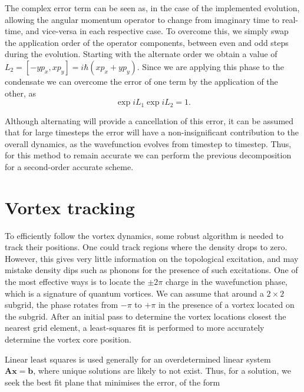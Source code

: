  The complex error term can be seen as, in the case of the implemented evolution, allowing the angular momentum operator to change from imaginary time to real-time, and vice-versa in each respective case. To overcome this, we simply swap the application order of the operator components, between even and odd steps during the evolution. Starting with the alternate order we obtain a value of $L_2 = [-y p_x, x p_y] = i\hbar \left(x p_x + y p_y \right)$. Since we are applying this phase to the condensate we can overcome the error of one term by the application of the other, as
 \begin{equation}
 \exp{i L_1}\exp{i L_2} = 1.
 \end{equation}

 Although alternating will provide a cancellation of this error, it can be assumed that for large timesteps the error will have a non-insignificant contribution to the overall dynamics, as the wavefunction evolves from timestep to timestep. Thus, for this method to remain accurate we can perform the previous decomposition for a second-order accurate scheme.

 \section{Vortex tracking}
 To efficiently follow the vortex dynamics, some robust algorithm is needed to track their positions. One could track regions where the density drops to zero. However, this gives very little information on the topological excitation, and may mistake density dips such as phonons for the presence of such excitations. One of the most effective ways is to locate the $\pm 2\pi$ charge in the wavefunction phase, which is a signature of quantum vortices. We can assume that around a $2\times 2$ subgrid, the phase rotates from $-\pi$ to $+\pi$ in the presence of a vortex located on the subgrid. After an initial pass to determine the vortex locations closest the nearest grid element, a least-squares fit is performed to more accurately determine the vortex core position.


 Linear least squares is used generally for an overdetermined linear system $\mathbf{A}\mathbf{x} = \mathbf{b}$, where unique solutions are likely to not exist. Thus, for a solution, we seek the best fit plane that minimises the error, of the form

